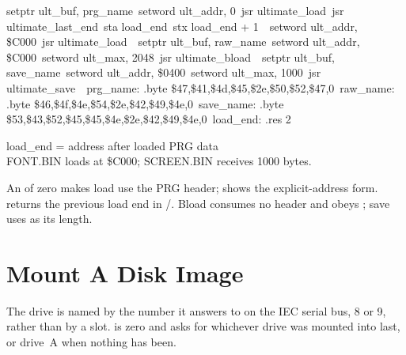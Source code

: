 \begin{listingbox}
\hspace*{2em}setptr ult\_buf, prg\_name\
\hspace*{2em}setword ult\_addr, 0\
\hspace*{2em}jsr ultimate\_load\
\hspace*{2em}jsr ultimate\_last\_end\
\hspace*{2em}sta load\_end\
\hspace*{2em}stx load\_end + 1\
\
\hspace*{2em}setword ult\_addr, \$C000\
\hspace*{2em}jsr ultimate\_load\
\
\hspace*{2em}setptr ult\_buf, raw\_name\
\hspace*{2em}setword ult\_addr, \$C000\
\hspace*{2em}setword ult\_max, 2048\
\hspace*{2em}jsr ultimate\_bload\
\
\hspace*{2em}setptr ult\_buf, save\_name\
\hspace*{2em}setword ult\_addr, \$0400\
\hspace*{2em}setword ult\_max, 1000\
\hspace*{2em}jsr ultimate\_save\
\
prg\_name:  .byte \$47,\$41,\$4d,\$45,\$2e,\$50,\$52,\$47,0\
raw\_name:  .byte \$46,\$4f,\$4e,\$54,\$2e,\$42,\$49,\$4e,0\
save\_name: .byte \$53,\$43,\$52,\$45,\$45,\$4e,\$2e,\$42,\$49,\$4e,0\
load\_end:  .res 2
\end{listingbox}

\begin{resultbox}
load_end = address after loaded PRG data\\
FONT.BIN loads at \$C000; SCREEN.BIN receives 1000 bytes.
\end{resultbox}

An \cmd{ult\_addr} of zero makes load use the PRG header;  shows
the explicit-address form.  returns the previous load
end in \cmd{A}/\cmd{X}. Bload consumes no header and obeys ; save
uses \cmd{ult\_max} as its length.


\section{Mount A Disk Image}

The drive is named by the number it answers to on the IEC serial bus, 8 or 9,
rather than by a slot.  is zero and asks for
whichever drive was mounted into last, or drive~A when nothing has been.

